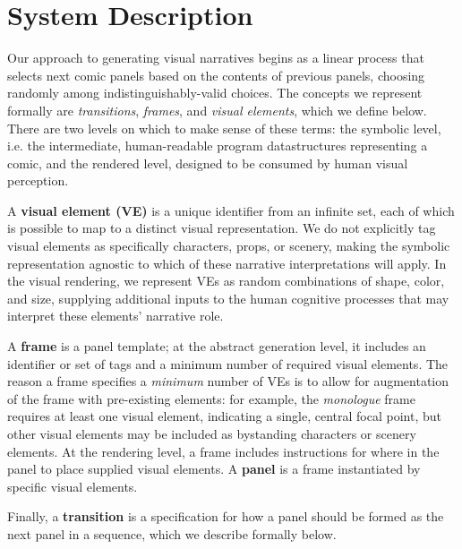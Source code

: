 \section{System Description}

Our approach to generating visual narratives begins as a linear
process that selects next comic panels based on the contents of previous
panels, choosing randomly among indistinguishably-valid choices.
The concepts we represent formally are {\em transitions}, {\em frames}, and
{\em visual elements}, which we define below. There are two levels on which
to make sense of these terms: the symbolic level, i.e. the intermediate,
human-readable program datastructures representing a comic, and the
rendered level, designed to be consumed by human visual perception.

A {\bf visual element (VE)} is a unique identifier from an infinite set,
each of which is possible to map to a distinct visual representation.
We do not explicitly tag visual elements as specifically characters, props,
or scenery, making the symbolic representation agnostic to which of these narrative
interpretations will apply. In the visual rendering, we represent VEs as
random combinations of shape, color, and size, supplying additional inputs
to the human cognitive processes that may interpret these elements'
narrative role.

A {\bf frame} is a panel template; at the abstract generation level, it
includes an identifier or set of tags and a minimum number of required
visual elements. The reason a frame specifies a {\em minimum} number of VEs
is to allow for augmentation of the frame with pre-existing elements: for
example, the {\em monologue} frame requires at least one visual element,
indicating a single, central focal point, but other visual elements may be
included as bystanding characters or scenery elements.
At the rendering level, a frame includes instructions for where in the
panel to place supplied visual elements.
A {\bf panel} is a frame instantiated by specific visual elements.


Finally, a {\bf transition} is a specification for how a panel should be
formed as the next panel in a sequence, which we describe formally below.

